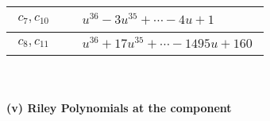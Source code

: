 \documentclass[1p]{elsarticle_modified}
\theoremstyle{definition}
\begin{document}
\begin{tabular}{m{50pt}|m{274pt}}
\hline $$\begin{aligned}c_{7},c_{10}\end{aligned}$$&$\begin{aligned}
&u^{36}-3 u^{35}+\cdots-4 u+1
\end{aligned}$\\
\hline $$\begin{aligned}c_{8},c_{11}\end{aligned}$$&$\begin{aligned}
&u^{36}+17 u^{35}+\cdots-1495 u+160
\end{aligned}$\\
\hline
\end{tabular}\\~\\
\newpage\renewcommand{\arraystretch}{1}
\flushleft \textbf{(v) Riley Polynomials at the component}\newline \\
\end{document}
